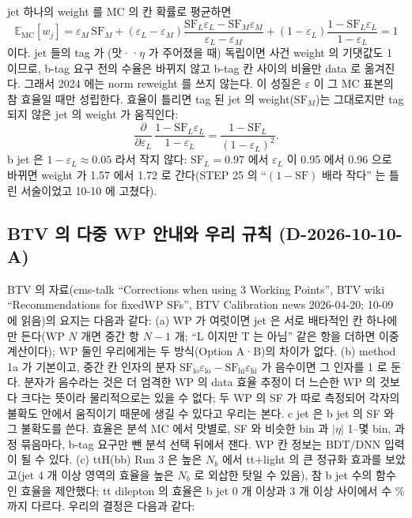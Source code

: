 \begin{note}
jet 하나의 weight 를 MC 의 칸 확률로 평균하면
\begin{equation}
  \mathbb{E}_\text{MC}[w_j] = \varepsilon_M\,\mathrm{SF}_M + (\varepsilon_L-\varepsilon_M)\frac{\mathrm{SF}_L\varepsilon_L-\mathrm{SF}_M\varepsilon_M}{\varepsilon_L-\varepsilon_M}
  + (1-\varepsilon_L)\frac{1-\mathrm{SF}_L\varepsilon_L}{1-\varepsilon_L} = 1
  \label{eq:btag-closure}
\end{equation}
이다. jet 들의 tag 가 (맛·\pt·$\eta$ 가 주어졌을 때) 독립이면 사건 weight 의 기댓값도 1 이므로, b-tag 요구 전의 수율은 바뀌지 않고 b-tag 칸
사이의 비율만 data 로 옮겨진다. 그래서 2024 에는 norm reweight 를 쓰지 않는다. 이 성질은 $\varepsilon$ 이 그 MC
표본의 참 효율일 때만 성립한다. 효율이 틀리면 tag 된 jet 의 weight($\mathrm{SF}_M$)는 그대로지만 tag 되지 않은 jet 의 weight 가 움직인다:
\begin{equation}
  \frac{\partial}{\partial\varepsilon_L}\,\frac{1-\mathrm{SF}_L\varepsilon_L}{1-\varepsilon_L} = \frac{1-\mathrm{SF}_L}{(1-\varepsilon_L)^2}.
  \label{eq:btag-sensitivity}
\end{equation}
b jet 은 $1-\varepsilon_L\approx 0.05$ 라서 작지 않다: $\mathrm{SF}_L=0.97$ 에서 $\varepsilon_L$ 이 0.95 에서 0.96 으로 바뀌면 weight 가 1.57 에서
1.72 로 간다(STEP 25 의 ``$(1-\mathrm{SF})$ 배라 작다'' 는 틀린 서술이었고 10-10 에 고쳤다).
\end{note}

\subsection{BTV 의 다중 WP 안내와 우리 규칙 (D-2026-10-10-A)}\label{sec:btag-btvrule}

BTV 의 자료(cms-talk ``Corrections when using 3 Working Points'', BTV wiki ``Recommendations for fixedWP SFs'', BTV Calibration news
2026-04-20; 10-09 에 읽음)의 요지는 다음과 같다: (a) WP 가 여럿이면 jet 은 서로 배타적인 칸 하나에만 든다(WP $N$ 개면 중간
항 $N-1$ 개; ``L 이지만 T 는 아님'' 같은 항을 더하면 이중 계산이다); WP 둘인 우리에게는 두 방식(Option A·B)의 차이가 없다. (b) method 1a 가
기본이고, 중간 칸 인자의 분자 $\mathrm{SF}_\text{lo}\varepsilon_\text{lo}-\mathrm{SF}_\text{hi}\varepsilon_\text{hi}$ 가 음수이면 그 인자를 1 로
둔다. 분자가 음수라는 것은 더 엄격한 WP 의 data 효율 추정이 더 느슨한 WP 의 것보다 크다는 뜻이라 물리적으로는 있을 수 없다; 두 WP 의 SF 가
따로 측정되어 각자의 불확도 안에서 움직이기 때문에 생길 수 있다고 우리는 본다. c jet 은 b jet 의 SF 와 그 불확도를 쓴다. 효율은 분석 MC 에서 맛별로, SF 와 비슷한 \pt{}
bin 과 $|\eta|$ 1–몇 bin, 과정 묶음마다, b-tag 요구만 뺀 분석 선택 뒤에서 잰다. WP 칸 정보는 BDT/DNN 입력이 될 수 있다. (c) ttH(bb) Run 3 은
높은 $N_b$ 에서 tt+light 의 큰 정규화 효과를 보았고(jet 4 개 이상 영역의 효율을 높은 $N_b$ 로 외삽한 탓일 수 있음), 참 b jet 수의 함수인
효율을 제안했다; tt dilepton 의 효율은 b jet 0 개 이상과 3 개 이상 사이에서 수 \% 까지 다르다. 우리의 결정은 다음과 같다\tagimpl:

